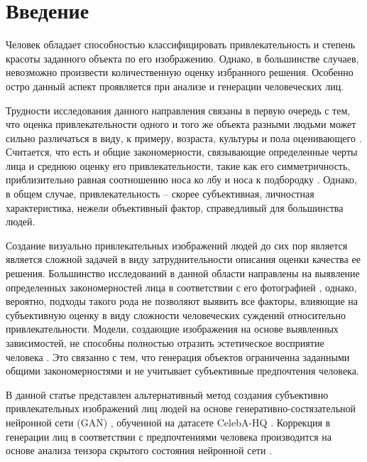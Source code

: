 \documentclass[60x84/16,8pt]{ittmm}
\begin{document}
\section{Введение}
\label{sec:intro}

Человек обладает способностью классифицировать привлекательность и степень
красоты заданного объекта по его изображению.
Однако, в большинстве случаев, невозможно произвести количественную оценку избранного решения.
Особенно остро данный аспект проявляется при анализе и генерации человеческих лиц.

Трудности исследования данного направления связаны в первую очередь с тем, что
оценка привлекательности одного и того же объекта разными людьми может сильно различаться
в виду, к примеру, возраста, культуры и пола оценивающего
\cite{facial-attractiveness-1, facial-attractiveness-2, facial-attractiveness-3}.
Считается, что есть и общие закономерности, связывающие определенные черты лица
и среднюю оценку его привлекательности, такие как его симметричность, приблизительно
равная соотношению носа ко лбу и носа к подбородку \cite{facial-attractiveness-math-1}.
Однако, в общем случае, привлекательность -- скорее субъективная, личностная характеристика,
нежели объективный фактор, справедливый для большинства людей.

Создание визуально привлекательных изображений людей до сих пор
является является сложной задачей в виду затруднительности описания
оценки качества ее решения. Большинство исследований в данной области
направлены на выявление определенных закономерностей лица в соответствии
с его фотографией \cite{facial-attractiveness-math-2, facial-attractiveness-math-3, facial-attractiveness-math-4},
однако, вероятно, подходы такого рода не позволяют выявить все
факторы, влияющие на субъективную оценку в виду сложности человеческих суждений
относительно привлекательности. Модели, создающие изображения на основе выявленных
зависимостей, не способны полностью отразить эстетическое восприятие человека \cite{attr-models-complicated}.
Это связанно с тем, что генерация объектов ограниченна заданными
общими закономерностями и не учитывает субъективные предпочтения человека.

В данной статье представлен альтернативный метод создания субъективно привлекательных
изображений лиц людей на основе генеративно-состязательной нейронной сети (GAN) \cite{gan},
обученной на датасете CelebA-HQ \cite{celeba-hq}.
Коррекция в генерации лиц в соответствии с предпочтениями человека производится
на основе анализа тензора скрытого состояния нейронной сети \cite{latent-space-exploration}. 
\end{document}
